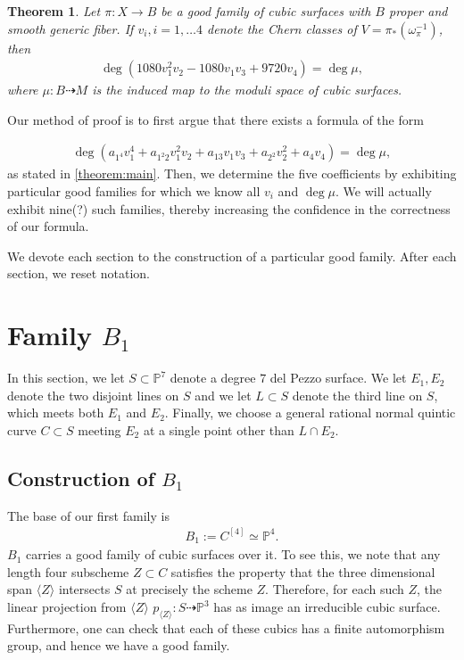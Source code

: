 \documentclass[12 pt]{amsart}
\newtheorem{theorem}{Theorem}[section]
\renewcommand{\P}{\mathbb{P}}
\newcommand{\<}{\left\langle}
\renewcommand{\>}{\right\rangle}
\begin{document}
\begin{theorem}\label{theorem:main}
  Let $\pi: X \to B$ be a good family of cubic surfaces with $B$
  proper and smooth generic fiber. If $v_{i}, i=1, \dots 4$ denote the
  Chern classes of $V = \pi_{*}(\omega_{\pi}^{-1})$, then
  \begin{align}
    \label{eq:MAIN}
   \deg( 1080v_{1}^{2}v_{2} - 1080v_{1}v_{3}+9720v_{4}) = \deg \mu,
  \end{align}
  where $\mu: B \dashrightarrow M$ is the induced map to the moduli
  space of cubic surfaces.
\end{theorem}


Our method of proof is to first argue that there exists a formula of the form

\begin{align}
  \label{eq:P}
  \deg (a_{1^4}v_{1}^{4} + a_{1^{2}2}v_{1}^{2}v_{2} + a_{13}v_{1}v_{3} + a_{2^2}v_{2}^{2} + a_{4}v_{4}) = \deg \mu,
\end{align}
as stated in \autoref{theorem:main}.  Then, we determine the five coefficients by exhibiting particular good
families for which we know all $v_{i}$ and $\deg \mu$.  We will
actually exhibit nine(?) such families, thereby increasing the
confidence in the correctness of our formula.

We devote each section to the construction of a particular good
family.  After each section, we reset
notation.

\section{Family $B_1$}
\label{sec:first-test-family}

In this section, we let $S \subset \P^7$ denote a degree $7$ del Pezzo
surface. We let $E_{1}, E_{2}$ denote the two disjoint lines on $S$
and we let $L \subset S$ denote the third line on $S$, which meets
both $E_{1}$ and $E_{2}$. Finally, we choose a general rational normal
quintic curve $C \subset S$ meeting $E_{2}$ at a single point other
than $L \cap E_{2}$.

\subsection{Construction of $B_1$}
\label{sec:construction-b_1}


The base of our first family is
\begin{align}
  \label{eq:B1}
  B_1 := C^{[4]} \simeq \P^{4}.
\end{align}
$B_1$ carries a good family of cubic surfaces over it.  To see this,
we note that any length four subscheme $Z \subset C$ satisfies the
property that the three dimensional span $\langle Z \rangle$
intersects $S$ at precisely the scheme $Z$. Therefore, for each such
$Z$, the linear projection from $\langle Z \rangle$
$p_{\langle Z \rangle}: S \dashrightarrow \P^{3}$ has as image an
irreducible cubic surface.  Furthermore, one can check that each of
these cubics has a finite automorphism group, and hence we have a good
family.
\end{document}
